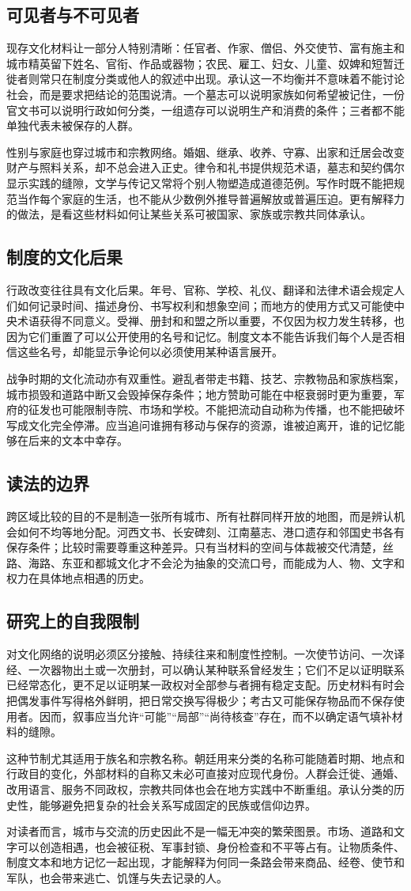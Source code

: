 \subsection{可见者与不可见者}
现存文化材料让一部分人特别清晰：任官者、作家、僧侣、外交使节、富有施主和城市精英留下姓名、官衔、作品或器物；农民、雇工、妇女、儿童、奴婢和短暂迁徙者则常只在制度分类或他人的叙述中出现。承认这一不均衡并不意味着不能讨论社会，而是要求把结论的范围说清。一个墓志可以说明家族如何希望被记住，一份官文书可以说明行政如何分类，一组遗存可以说明生产和消费的条件；三者都不能单独代表未被保存的人群。

性别与家庭也穿过城市和宗教网络。婚姻、继承、收养、守寡、出家和迁居会改变财产与照料关系，却不总会进入正史。律令和礼书提供规范术语，墓志和契约偶尔显示实践的缝隙，文学与传记又常将个别人物塑造成道德范例。写作时既不能把规范当作每个家庭的生活，也不能从少数例外推导普遍解放或普遍压迫。更有解释力的做法，是看这些材料如何让某些关系可被国家、家族或宗教共同体承认。

\subsection{制度的文化后果}
行政改变往往具有文化后果。年号、官称、学校、礼仪、翻译和法律术语会规定人们如何记录时间、描述身份、书写权利和想象空间；而地方的使用方式又可能使中央术语获得不同意义。受禅、册封和和盟之所以重要，不仅因为权力发生转移，也因为它们重置了可以公开使用的名号和记忆。制度文本不能告诉我们每个人是否相信这些名号，却能显示争论何以必须使用某种语言展开。

战争时期的文化流动亦有双重性。避乱者带走书籍、技艺、宗教物品和家族档案，城市损毁和道路中断又会毁掉保存条件；地方赞助可能在中枢衰弱时更为重要，军府的征发也可能限制寺院、市场和学校。不能把流动自动称为传播，也不能把破坏写成文化完全停滞。应当追问谁拥有移动与保存的资源，谁被迫离开，谁的记忆能够在后来的文本中幸存。

\subsection{读法的边界}
跨区域比较的目的不是制造一张所有城市、所有社群同样开放的地图，而是辨认机会如何不均等地分配。河西文书、长安碑刻、江南墓志、港口遗存和邻国史书各有保存条件；比较时需要尊重这种差异。只有当材料的空间与体裁被交代清楚，丝路、海路、东亚和都城文化才不会沦为抽象的交流口号，而能成为人、物、文字和权力在具体地点相遇的历史。

\subsection{研究上的自我限制}
对文化网络的说明必须区分接触、持续往来和制度性控制。一次使节访问、一次译经、一次器物出土或一次册封，可以确认某种联系曾经发生；它们不足以证明联系已经常态化，更不足以证明某一政权对全部参与者拥有稳定支配。历史材料有时会把偶发事件写得格外鲜明，把日常交换写得极少；考古又可能保存物品而不保存使用者。因而，叙事应当允许“可能”“局部”“尚待核查”存在，而不以确定语气填补材料的缝隙。

这种节制尤其适用于族名和宗教名称。朝廷用来分类的名称可能随着时期、地点和行政目的变化，外部材料的自称又未必可直接对应现代身份。人群会迁徙、通婚、改用语言、服务不同政权，宗教共同体也会在地方实践中不断重组。承认分类的历史性，能够避免把复杂的社会关系写成固定的民族或信仰边界。

对读者而言，城市与交流的历史因此不是一幅无冲突的繁荣图景。市场、道路和文字可以创造相遇，也会被征税、军事封锁、身份检查和不平等占有。让物质条件、制度文本和地方记忆一起出现，才能解释为何同一条路会带来商品、经卷、使节和军队，也会带来逃亡、饥馑与失去记录的人。
